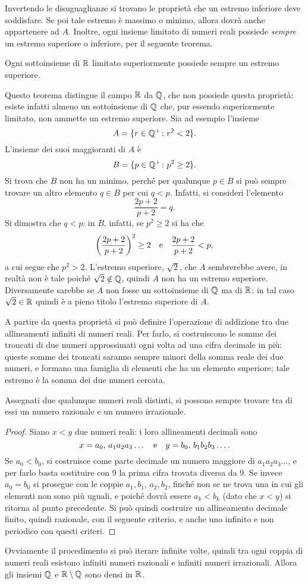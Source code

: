 Invertendo le disuguaglianze si trovano le proprietà che un estremo inferiore deve soddisfare. Se poi tale estremo è massimo o minimo, allora dovrà anche appartenere ad $A$.
Inoltre, ogni insieme limitato di numeri reali possiede \emph{sempre} un estremo superiore o inferiore, per il seguente teorema.
\begin{teorema}
Ogni sottoinsieme di $\R$ limitato superiormente possiede sempre un estremo superiore.
\end{teorema}
Questo teorema distingue il campo $\R$ da $\mathbb{Q}$, che non possiede questa proprietà: esiste infatti almeno un sottoinsieme di $\mathbb{Q}$ che, pur essendo superiormente limitato, non ammette un estremo superiore. Sia ad esempio l'insieme
\[
A=\{r\in\mathbb{Q}^+\colon r^2<2\}.
\]
L'insieme dei suoi maggioranti di $A$ è
\[
B=\{p\in\mathbb{Q}^+\colon p^2\geq 2\}.
\]
Si trova che $B$ non ha un minimo, perché per qualunque $p\in B$ si può sempre trovare un altro elemento $q\in B$ per cui $q<p$. Infatti, si consideri l'elemento
\[
\frac{2p+2}{p+2}=q.
\]
Si dimostra che $q<p$: in $B$, infatti, se $p^2\geq 2$ si ha che
\[
\bigg(\frac{2p+2}{p+2}\bigg)^2\geq 2\quad\text{e}\quad\frac{2p+2}{p+2}<p,
\]
a cui segue che $p^2>2$.
L'estremo superiore, $\sqrt{2}$, che $A$ sembrerebbe avere, in realtà non è tale poiché $\sqrt{2}\notin\mathbb{Q}$, quindi $A$ non ha un estremo superiore. Diversamente sarebbe se $A$ non fosse un sottoinsieme di $\mathbb{Q}$ ma di $\R$: in tal caso $\sqrt{2}\in\mathbb{R}$ quindi è a pieno titolo l'estremo superiore di $A$.

A partire da questa proprietà si può definire l'operazione di addizione tra due allineamenti infiniti di numeri reali.
Per farlo, si costruiscono le somme dei troncati di due numeri approssimati ogni volta ad una cifra decimale in più: queste somme dei troncati saranno sempre minori della somma reale dei due numeri, e formano una famiglia di elementi che ha un elemento superiore; tale estremo è la somma dei due numeri cercata.

\begin{teorema}[densità di $\R$]
Assegnati due qualunque numeri reali distinti, si possono sempre trovare tra di essi un numero razionale e un numero irrazionale.
\end{teorema}
\begin{proof}
Siano $x<y$ due numeri reali: i loro allineamenti decimali sono
\[
x=a_0,\,a_1a_2a_3\dots\quad\text{e}\quad y=b_0,\,b_1b_2b_3\dots.
\]
Se $a_0<b_0$, si costruisce come parte decimale un numero maggiore di $a_1a_2a_3\dots$, e per farlo basta sostituire con 9 la prima cifra trovata diversa da 9.
Se invece $a_0=b_0$ si prosegue con le coppie $a_1,b_1$, $a_2,b_2$, finché non se ne trova una in cui gli elementi non sono più uguali, e poiché dovrà essere $a_k<b_k$ (dato che $x<y$) si ritorna al punto precedente.
Si può quindi costruire un allineamento decimale finito, quindi razionale, con il seguente criterio, e anche uno infinito e non periodico con questi criteri.
\end{proof}
Ovviamente il procedimento si può iterare infinite volte, quindi tra ogni coppia di numeri reali esistono infiniti numeri razionali e infiniti numeri irrazionali. Allora gli insiemi $\mathbb{Q}$ e $\mathbb{R}\setminus\mathbb{Q}$ sono densi in $\R$.

